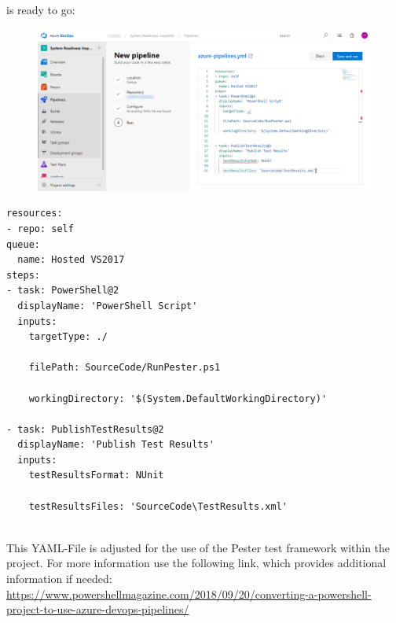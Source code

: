 is ready to go:
\begin{figure}[H]
    \centering
    \includegraphics[width=0.7\linewidth]{assets/devops4.png}
\end{figure}
\begin{lstlisting}
resources:
- repo: self
queue:
  name: Hosted VS2017
steps:
- task: PowerShell@2
  displayName: 'PowerShell Script'
  inputs:
    targetType: ./

    filePath: SourceCode/RunPester.ps1

    workingDirectory: '$(System.DefaultWorkingDirectory)'

- task: PublishTestResults@2
  displayName: 'Publish Test Results'
  inputs:
    testResultsFormat: NUnit

    testResultsFiles: 'SourceCode\TestResults.xml'
\end{lstlisting}\ \\
This YAML-File is adjusted for the use of the Pester test framework within the project. For more information use the following link, which provides additional information if needed:
\\
\url{https://www.powershellmagazine.com/2018/09/20/converting-a-powershell-project-to-use-azure-devops-pipelines/}